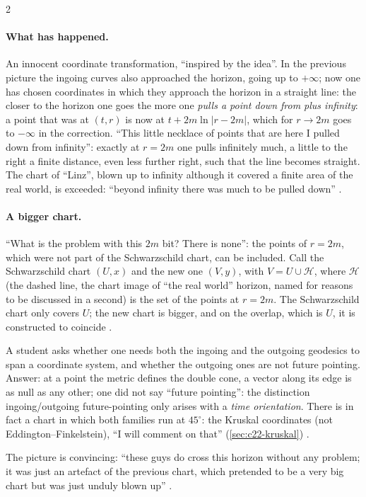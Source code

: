 \begin{paracol}{2}
\paragraph{What has happened.} An innocent coordinate transformation, ``inspired by the idea''. In the previous picture the ingoing curves also approached the horizon, going up to $+\infty$; now one has chosen coordinates in which they approach the horizon in a straight line: the closer to the horizon one goes the more one \emph{pulls a point down from plus infinity}: a point that was at $(t,r)$ is now at $t+2m\ln|r-2m|$, which for $r\to2m$ goes to $-\infty$ in the correction. ``This little necklace of points that are here I pulled down from infinity'': exactly at $r=2m$ one pulls infinitely much, a little to the right a finite distance, even less further right, such that the line becomes straight. The chart of ``Linz'', blown up to infinity although it covered a finite area of the real world, is exceeded: ``beyond infinity there was much to be pulled down'' .

\paragraph{A bigger chart.} ``What is the problem with this $2m$ bit? There is none'': the points of $r=2m$, which were not part of the Schwarzschild chart, can be included. Call the Schwarzschild chart $(U,x)$ and the new one $(V,y)$, with $V=U\cup\mathcal H$, where $\mathcal H$ (the dashed line, the chart image of ``the real world'' horizon, named for reasons to be discussed in a second) is the set of the points at $r=2m$. The Schwarzschild chart only covers $U$; the new chart is bigger, and on the overlap, which is $U$, it is constructed to coincide .
\begin{coursenote}
A student asks whether one needs both the ingoing and the outgoing geodesics to span a coordinate system, and whether the outgoing ones are not future pointing. Answer: at a point the metric defines the double cone, a vector along its edge is as null as any other; one did not say ``future pointing'': the distinction ingoing/outgoing future-pointing only arises with a \emph{time orientation}. There is in fact a chart in which both families run at $45^\circ$: the Kruskal coordinates (not Eddington--Finkelstein), ``I will comment on that'' (\cref{sec:c22-kruskal}) .
\end{coursenote}
The picture is convincing: ``these guys do cross this horizon without any problem; it was just an artefact of the previous chart, which pretended to be a very big chart but was just unduly blown up'' .


\end{paracol}
